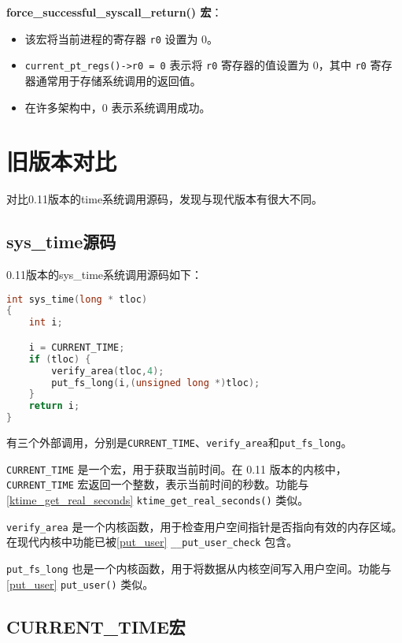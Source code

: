 \documentclass[12pt,hyperref,a4paper,UTF8]{ctexart}
\begin{document}
\textbf{force\_successful\_syscall\_return() 宏}：

\begin{itemize}
    \item 该宏将当前进程的寄存器 \lstinline|r0| 设置为 0。
    \item \lstinline|current_pt_regs()->r0 = 0| 表示将 \lstinline|r0| 寄存器的值设置为 0，其中 \lstinline|r0| 寄存器通常用于存储系统调用的返回值。
    \item 在许多架构中，0 表示系统调用成功。
\end{itemize}

\section{旧版本对比}

对比0.11版本的time系统调用源码\cite{linux_kernel_0_11}，发现与现代版本有很大不同。

\subsection{sys\_time源码}

0.11版本的sys\_time系统调用源码如下：

\begin{lstlisting}[language=C, caption=sys\_time() in sys.c, label=sys_time]
int sys_time(long * tloc)
{
	int i;

	i = CURRENT_TIME;
	if (tloc) {
		verify_area(tloc,4);
		put_fs_long(i,(unsigned long *)tloc);
	}
	return i;
}
\end{lstlisting}

有三个外部调用，分别是\lstinline|CURRENT_TIME|、\lstinline|verify_area|和\lstinline|put_fs_long|。

\lstinline|CURRENT_TIME| 是一个宏，用于获取当前时间。在 0.11 版本的内核中，\lstinline|CURRENT_TIME| 宏返回一个整数，表示当前时间的秒数。功能与\ref{ktime_get_real_seconds}  \lstinline|ktime_get_real_seconds()| 类似。

\lstinline|verify_area| 是一个内核函数，用于检查用户空间指针是否指向有效的内存区域。在现代内核中功能已被\ref{put_user} \lstinline|__put_user_check| 包含。

\lstinline|put_fs_long| 也是一个内核函数，用于将数据从内核空间写入用户空间。功能与\ref{put_user} \lstinline|put_user()| 类似。

\subsection{CURRENT\_TIME宏}
\end{document}
